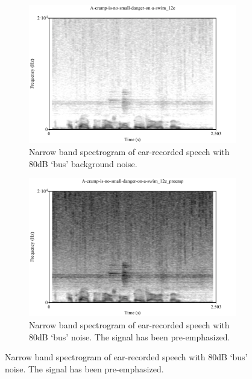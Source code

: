 \begin{figure}[h!]
\centering
\begin{subfigure}{0.475\textwidth}
  \centering
  \includegraphics[width=1\linewidth]{figure/spctgrmEarNarrow20kHz.pdf}
  \caption{Narrow band spectrogram of ear-recorded speech with 80dB `bus' background noise.}
  \label{spctgrmEarNarrow20kHz}
\end{subfigure}%
\hfill
\begin{subfigure}{0.475\textwidth}
  \centering
  \includegraphics[width=1\linewidth]{figure/spctgrmNarrowEarNoisePremp.pdf}
  \caption{Narrow band spectrogram of ear-recorded speech with 80dB `bus' noise.  The signal has been pre-emphasized.}
  \label{spctgrmNarrowEarNoisePremp_35}
\end{subfigure}

\end{figure}
